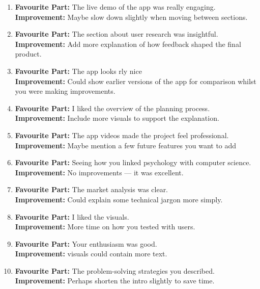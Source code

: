 \begin{enumerate}
    \item \textbf{Favourite Part:} The live demo of the app was really engaging. \\
          \textbf{Improvement:} Maybe slow down slightly when moving between sections.

    \item \textbf{Favourite Part:} The section about user research was insightful. \\
          \textbf{Improvement:} Add more explanation of how feedback shaped the final product.

    \item \textbf{Favourite Part:} The app looks rly nice \\
          \textbf{Improvement:} Could show earlier versions of the app for comparison whilst you were making improvements.

    \item \textbf{Favourite Part:} I liked the overview of the planning process. \\
          \textbf{Improvement:} Include more visuals to support the explanation.

    \item \textbf{Favourite Part:} The app videos made the project feel professional. \\
          \textbf{Improvement:} Maybe mention a few future features you want to add

    \item \textbf{Favourite Part:} Seeing how you linked psychology with computer science. \\
          \textbf{Improvement:} No improvements — it was excellent.

    \item \textbf{Favourite Part:} The market analysis was clear. \\
          \textbf{Improvement:} Could explain some technical jargon more simply.

    \item \textbf{Favourite Part:} I liked the visuals. \\
          \textbf{Improvement:} More time on how you tested with users.

    \item \textbf{Favourite Part:} Your enthusiasm was good. \\
          \textbf{Improvement:} visuals could contain more text.

    \item \textbf{Favourite Part:} The problem-solving strategies you described. \\
          \textbf{Improvement:} Perhaps shorten the intro slightly to save time.


\end{enumerate}

